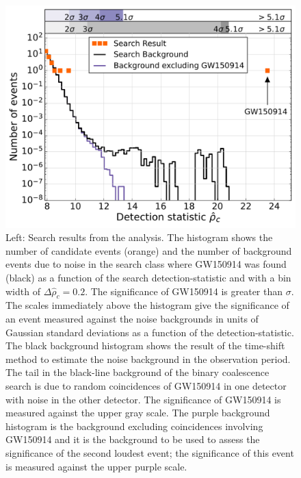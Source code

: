 \begin{figure}[t!]
\centering
\includegraphics[width=\textwidth]{figs/chapter2/pycbc-hist-0p1s-sigmas.pdf}
\caption{Left: Search results from the \pycbc{} analysis. The histogram shows
the number of candidate events (orange) and the number of background events
due to noise in the search class where GW150914 was found (black) as a
function of the search detection-statistic and with a bin width of $\Delta
\hat{\rho}_c = 0.2$. The significance of GW150914 is greater than
{\CBCEVENTSIGMA} $\sigma$.  The scales immediately above the histogram give
the significance of an event measured against the noise backgrounds in units
of Gaussian standard deviations as a function of the detection-statistic.  The
black background histogram shows the result of the time-shift method to
estimate the noise background in the observation period. The tail in the
black-line background of the binary coalescence search is due to random
coincidences of GW150914 in one detector with noise in the other detector. The
significance of GW150914 is measured against the upper gray scale.  The purple
background histogram is the background excluding coincidences involving
GW150914 and it is the background to be used to assess the significance of the
second loudest event; the significance of this event is measured against the
upper purple scale.}
\label{fig:both_results}
\end{figure}

